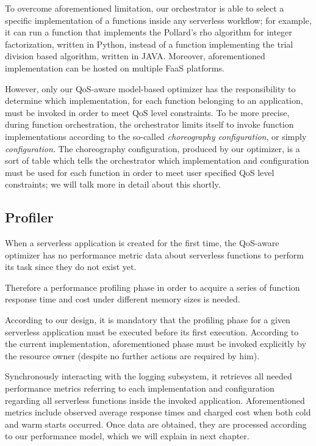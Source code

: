 \documentclass[12pt,a4paper]{report}
\begin{document}
To overcome aforementioned limitation, our orchestrator is able to select a specific implementation of a functions inside any serverless workflow; for example, it can run a function that implements the Pollard's rho algorithm for integer factorization, written in Python, instead of a function implementing the trial division based algorithm, written in JAVA. Moreover, aforementioned implementation can be hosted on multiple FaaS platforms.

However, only our QoS-aware model-based optimizer has the responsibility to determine which implementation, for each function belonging to an application, must be invoked in order to meet QoS level constraints. To be more precise, during function orchestration, the orchestrator limits itself to invoke function implementations according to the so-called \textit{choreography configuration}, or simply \textit{configuration}. The choreography configuration, produced by our optimizer, is a sort of table which tells the orchestrator which implementation and configuration must be used for each function in order to meet user specified QoS level constraints; we will talk more in detail about this shortly.
	
\subsection{Profiler}

When a serverless application is created for the first time, the QoS-aware optimizer has no performance metric data about serverless functions to perform its task since they do not exist yet. 

Therefore a performance profiling phase in order to acquire a series of function response time and cost under different memory sizes is needed. 

According to our design, it is mandatory that the profiling phase for a given serverless application must be executed before its first execution. According to the current implementation, aforementioned phase must be invoked explicitly by the resource owner (despite no further actions are required by him).

Synchronously interacting with the logging subsystem, it retrieves all needed performance metrics referring to each implementation and configuration regarding all serverless functions inside the invoked application. Aforementioned metrics include observed average response times and charged cost when both cold and warm starts occurred. Once data are obtained, they are processed according to our performance model, which we will explain in next chapter.
\end{document}
